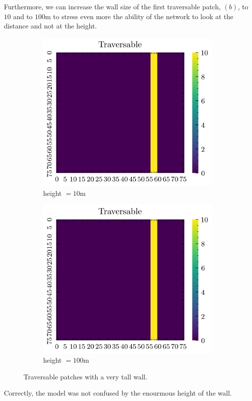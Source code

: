 \documentclass[../document.tex]{subfiles}
\begin{document}
Furthermore, we can increase the wall size of the first traversable patch, $(b)$, to $10$ and to $100$m to stress even more the ability of the network to look at the distance and not at the height.

\begin{figure}[H]
    \centering
    \begin{subfigure}[b]{0.33\textwidth}
        \includegraphics[width=\linewidth]{../img/5/custom_patches/walls_front/big-1-2d.png}
    \caption{height $=10$m}
    \end{subfigure}   
    \begin{subfigure}[b]{0.33\textwidth}
        \includegraphics[width=\linewidth]{../img/5/custom_patches/walls_front/big-1-2d.png}
        \caption{height $=100$m}
    \end{subfigure}   
\caption{Traversable patches with a very tall wall.}    
\end{figure}
Correctly, the model was not confused by the enourmous height of the wall.
\end{document}
